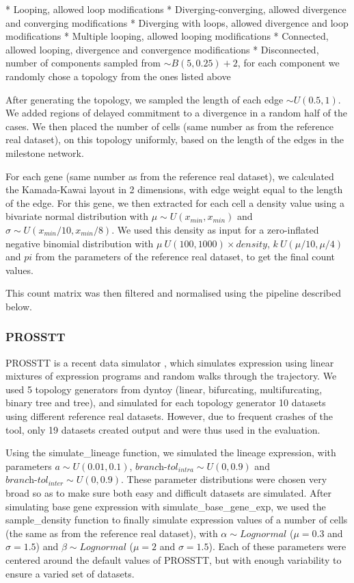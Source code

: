 * Looping, allowed loop modifications
* Diverging-converging, allowed divergence and converging modifications
* Diverging with loops, allowed divergence and loop modifications
* Multiple looping, allowed looping modifications
* Connected, allowed looping, divergence and convergence modifications
* Disconnected, number of components sampled from $\sim B(5, 0.25) + 2$, for each component we randomly chose a topology from the ones listed above

After generating the topology, we sampled the length of each edge $\sim U(0.5, 1)$. We added regions of delayed commitment to a divergence in a random half of the cases. We then placed the number of cells (same number as from the reference real dataset), on this topology uniformly, based on the length of the edges in the milestone network.

For each gene (same number as from the reference real dataset), we calculated the Kamada-Kawai layout in 2 dimensions, with edge weight equal to the length of the edge. For this gene, we then extracted for each cell a density value using a bivariate normal distribution with $\mu \sim U(x_{\textit{min}}, x_{\textit{min}})$ and $\sigma \sim U(x_{\textit{min}}/10, x_{\textit{min}}/8)$. We used this density as input for a zero-inflated negative binomial distribution with $\mu ~ U(100, 1000) \times \textit{density}$, $k ~ U(\mu / 10, \mu / 4)$ and $pi$ from the parameters of the reference real dataset, to get the final count values.

This count matrix was then filtered and normalised using the pipeline described below.

\subsubsection{PROSSTT}

PROSSTT is a recent data simulator \cite{papadopoulos_prossttprobabilisticsimulation_2018}, which simulates expression using linear mixtures of expression programs and random walks through the trajectory. We used 5 topology generators from dyntoy (linear, bifurcating, multifurcating, binary tree and tree), and simulated for each topology generator 10 datasets using different reference real datasets. However, due to frequent crashes of the tool, only 19 datasets created output and were thus used in the evaluation.

Using the simulate\_lineage function, we simulated the lineage expression, with parameters $a \sim U(0.01, 0.1)$, $\textit{branch-tol}_{\textit{intra}} \sim U(0, 0.9)$ and $\textit{branch-tol}_{\textit{inter}} \sim U(0, 0.9)$. These parameter distributions were chosen very broad so as to make sure both easy and difficult datasets are simulated. After simulating base gene expression with simulate\_base\_gene\_exp, we used the sample\_density function to finally simulate expression values of a number of cells (the same as from the reference real dataset), with $\alpha \sim \textit{Lognormal}$ ($\mu = 0.3$ and $\sigma = 1.5$) and $\beta \sim \textit{Lognormal}$ ($\mu = 2$ and $\sigma = 1.5$). Each of these parameters were centered around the default values of PROSSTT, but with enough variability to ensure a varied set of datasets.

